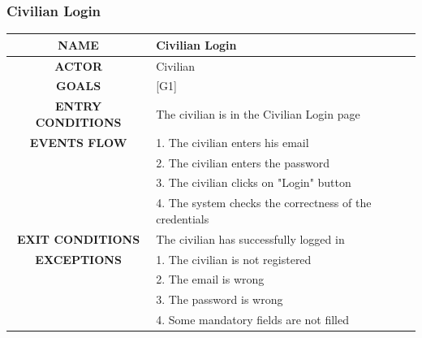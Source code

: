 \documentclass[12pt,a4paper]{article}
\begin{document}
\subsubsection{Civilian Login}
		\begin{center}
			\begin{tabular}{| c | l |}
				\hline
				\textbf{NAME} & Civilian Login \\
				\hline
				\textbf{ACTOR} & Civilian \\
				\hline
				\textbf{GOALS} & [G1] \\
				\hline
				\textbf{ENTRY CONDITIONS} & The civilian is in the Civilian Login page \\ \hline
				\textbf{EVENTS FLOW}  &
				1. The civilian enters his email\\
				&2. The civilian enters the password\\
				&3. The civilian clicks on "Login" button\\
				&4. The system checks the correctness of the credentials\\
				\hline
				\textbf{EXIT CONDITIONS}  & The civilian has successfully logged in \\ \hline
				\textbf{EXCEPTIONS} &
				1. The civilian is not registered\\
				&2. The email is wrong\\
				&3. The password is wrong\\
				&4. Some mandatory fields are not filled\\
				\hline
			\end{tabular}
		\end{center}
\newpage
\end{document}
